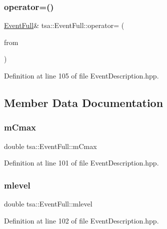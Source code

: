 \subsubsection{\texorpdfstring{operator=()}{operator=()}}
{\footnotesize\ttfamily \hyperlink{classtsa_1_1_event_full}{Event\+Full}\& tsa\+::\+Event\+Full\+::operator= (\begin{DoxyParamCaption}\item[{const \hyperlink{classtsa_1_1_event_full}{Event\+Full} \&}]{from }\end{DoxyParamCaption})\hspace{0.3cm}{\ttfamily [inline]}}



Definition at line 105 of file Event\+Description.\+hpp.



\subsection{Member Data Documentation}
\mbox{\label{classtsa_1_1_event_full_a8abbd6e97b23d2c69bc57fa4c055e8ec}} 
\subsubsection{\texorpdfstring{m\+Cmax}{mCmax}}
{\footnotesize\ttfamily double tsa\+::\+Event\+Full\+::m\+Cmax}



Definition at line 101 of file Event\+Description.\+hpp.

\mbox{\label{classtsa_1_1_event_full_a29245bb8db5f94ca1cb6559b55e741c3}} 
\subsubsection{\texorpdfstring{mlevel}{mlevel}}
{\footnotesize\ttfamily double tsa\+::\+Event\+Full\+::mlevel}



Definition at line 102 of file Event\+Description.\+hpp.

\mbox{\label{classtsa_1_1_event_full_a1cfa881637a706ed70a27cabfa5d8039}} 
